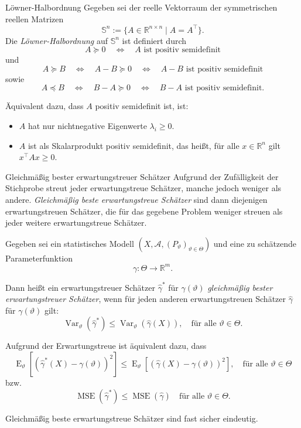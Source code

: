 \begin{bonus}{Löwner-Halbordnung}
    Gegeben sei der reelle Vektorraum der symmetrischen reellen Matrizen
    \[
        \mathbb{S}^n := \{ A \in \mathbb{R}^{n \times n} \mid A = A^\top \}.
    \]
    Die \emph{Löwner-Halbordnung} auf $\mathbb{S}^n$ ist definiert durch
    \[
        A \succeq 0 \quad \iff \quad A \text{ ist positiv semidefinit}
    \]
    und
    \[
        A \succeq B \quad \iff \quad A - B \succeq 0 \quad \iff \quad A - B \text{ ist positiv semidefinit}
    \]
    sowie
    \[
        A \preceq B \quad \iff \quad B - A \succeq 0 \quad \iff \quad B - A \text{ ist positiv semidefinit}.
    \]

    Äquivalent dazu, dass $A$ positiv semidefinit ist, ist:
    \begin{itemize}
        \item $A$ hat nur nichtnegative Eigenwerte $\lambda_i \geq 0$.
        \item $A$ ist als Skalarprodukt positiv semidefinit, das heißt, für alle $x \in \mathbb{R}^n$ gilt $x^\top A x \geq 0$.
    \end{itemize}
\end{bonus}

\begin{defi}{Gleichmäßig bester erwartungstreuer Schätzer}
    Aufgrund der Zufälligkeit der Stichprobe streut jeder erwartungstreue Schätzer, manche jedoch weniger als andere.
    \emph{Gleichmäßig beste erwartungstreue Schätzer} sind dann diejenigen erwartungstreuen Schätzer, die für das gegebene Problem weniger streuen als jeder weitere erwartungstreue Schätzer.

    Gegeben sei ein statistisches Modell $(X, \mathcal{A}, (P_{\vartheta})_{\vartheta \in \Theta})$ und eine zu schätzende Parameterfunktion
    \[
        \gamma: \Theta \to \mathbb{R}^m.
    \]

    Dann heißt ein erwartungstreuer Schätzer $\hat{\gamma}^*$ für $\gamma(\vartheta)$ \emph{gleichmäßig bester erwartungstreuer Schätzer}, wenn für jeden anderen erwartungstreuen Schätzer $\hat{\gamma}$ für $\gamma(\vartheta)$ gilt:
    \[
        \operatorname{Var}_{\vartheta}(\hat{\gamma}^*) \leq \operatorname{Var}_{\vartheta}(\hat{\gamma}(X)), \quad \text{für alle } \vartheta \in \Theta.
    \]

    Aufgrund der Erwartungstreue ist äquivalent dazu, dass
    \[
        \operatorname{E}_{\vartheta}[(\hat{\gamma}^*(X) - \gamma(\vartheta))^2] \leq \operatorname{E}_{\vartheta}[(\hat{\gamma}(X) - \gamma(\vartheta))^2], \quad \text{für alle } \vartheta \in \Theta
    \]
    bzw.
    \[
        \operatorname{MSE}(\hat{\gamma}^*) \leq \operatorname{MSE}(\hat{\gamma}) \quad \text{für alle } \vartheta \in \Theta.
    \]

    Gleichmäßig beste erwartungstreue Schätzer sind fast sicher eindeutig.
\end{defi}

